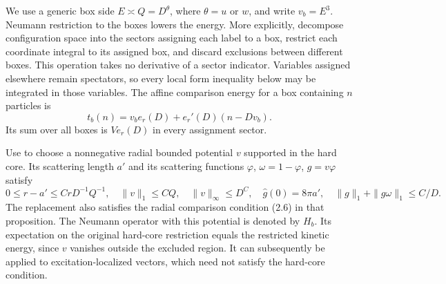 We use a generic box side $E\asymp Q=D^\theta$, where $\theta=u$ or $w$,
and write $v_b=E^3$.  Neumann restriction to the boxes lowers the energy.
More explicitly, decompose configuration space into the sectors assigning
each label to a box, restrict each coordinate integral to its assigned
box, and discard exclusions between different boxes.  This operation
takes no derivative of a sector indicator.  Variables assigned elsewhere
remain spectators, so every local form inequality below may be integrated
in those variables.  The affine comparison energy for a box containing
$n$ particles is
\begin{equation}\label{en:tangent}
 t_b(n)=v_b e_r(D)+e_r'(D)(n-Dv_b).
\end{equation}
Its sum over all boxes is $Ve_r(D)$ in every assignment sector.

Use \cite[Proposition~2.1]{FJGMOT} to choose a nonnegative radial bounded
potential $v$ supported in the hard core.  Its scattering length $a'$ and
its scattering functions $\varphi$, $\omega=1-\varphi$, $g=v\varphi$
satisfy
\begin{equation}\label{en:replacement}
 0\le r-a'\le CrD^{-1}Q^{-1},\quad
 \|v\|_1\le CQ,\quad
 \|v\|_\infty\le D^{C},\quad
 \widehat g(0)=8\pi a',\quad
 \|g\|_1+\|g\omega\|_1\le C/D.
\end{equation}
The replacement also satisfies the radial comparison condition (2.6)
in that proposition.  The Neumann operator with this potential is denoted
by $H_b$.  Its expectation on the original hard-core restriction equals
the restricted kinetic energy, since $v$ vanishes outside the excluded
region.  It can subsequently be applied to excitation-localized vectors,
which need not satisfy the hard-core condition.

